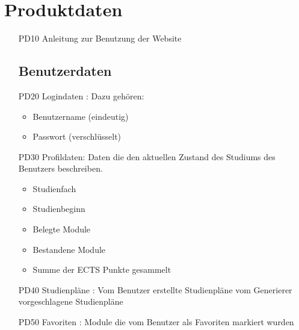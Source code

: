 \section{Produktdaten}
	\begin{itemize}[nosep]
	\addtolength{\itemindent}{5mm}
	\subsection{Systemdaten}
	\item[PD10]Anleitung zur Benutzung der 		Website
	\subsection{Benutzerdaten}
	\item[PD20]Logindaten : Dazu gehören:
		\begin{itemize}
		\item Benutzername (eindeutig)
		\item Passwort (verschlüsselt)\\
		\end{itemize}
	\item[PD30]Profildaten: Daten die den aktuellen Zustand des Studiums des Benutzers beschreiben.
		\begin{itemize}
		\item Studienfach
		\item Studienbeginn
		\item Belegte Module
		\item Bestandene Module 
		\item Summe der ECTS Punkte gesammelt\\
		\end{itemize}
\item[PD40]Studienpläne : 
	Vom Benutzer erstellte Studienpläne 
	vom Generierer vorgeschlagene Studienpläne 
\item[PD50] Favoriten : Module die vom Benutzer als Favoriten markiert wurden
\end{itemize}
